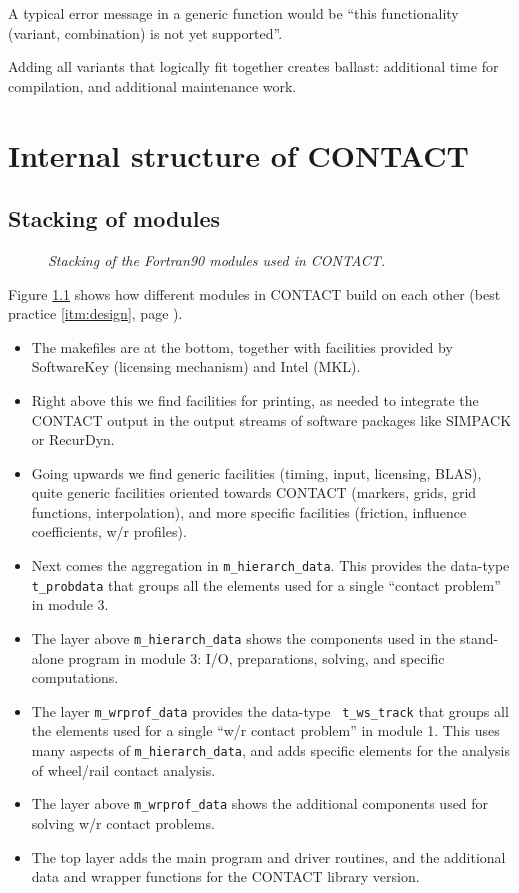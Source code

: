 \documentclass[12pt]{report}
\begin{document}
A typical error message in a generic function would be ``this functionality
(variant, combination) is not yet supported''.

Adding all variants that logically fit together creates ballast: additional
time for compilation, and additional maintenance work.

\chapter{Internal structure of CONTACT}

\section{Stacking of modules}

\begin{figure}[p]
\centering
{}
\caption{\em Stacking of the Fortran90 modules used in CONTACT.}
\label{fig:arch_modules2}
\end{figure}

Figure \ref{fig:arch_modules2} shows how different modules in CONTACT build
on each other (best practice \ref{itm:design}, page \pageref{itm:design}). 
\begin{itemize}
\item The makefiles are at the bottom, together with facilities provided
        by SoftwareKey (licensing mechanism) and Intel (MKL). 
\item Right above this we find facilities for printing, as needed to
        integrate the CONTACT output in the output streams of software
        packages like SIMPACK or RecurDyn.
\item Going upwards we find generic facilities (timing, input, licensing,
        BLAS), quite generic facilities oriented towards CONTACT (markers,
        grids, grid functions, interpolation), and more specific facilities
        (friction, influence coefficients, w/r profiles).
\item Next comes the aggregation in {\tt m\_hierarch\_data}. This provides
        the data-type {\tt t\_probdata} that groups all the elements used
        for a single ``contact problem'' in module 3.
\item The layer above {\tt m\_hierarch\_data} shows the components used
        in the stand-alone program in module 3: I/O, preparations, solving,
        and specific computations.
\item The layer {\tt m\_wrprof\_data} provides the data-type {\tt
        t\_ws\_track} that groups all the elements used for a single
        ``w/r contact problem'' in module 1. This uses many aspects of
        {\tt m\_\-hierarch\_\-data}, and adds specific elements for the analysis
        of wheel/rail contact analysis.
\item The layer above {\tt m\_wrprof\_data} shows the additional components
        used for solving w/r contact problems.
\item The top layer adds the main program and driver routines, and the
        additional data and wrapper functions for the CONTACT library
        version.
\end{itemize}
\end{document}
